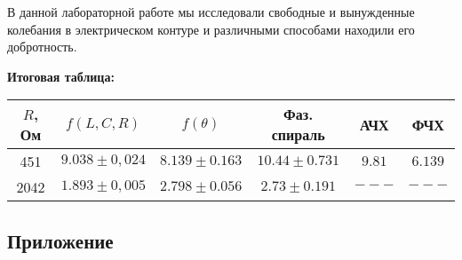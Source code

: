 \documentclass[a4paper,12pt]{article} %
\begin{document}
В данной лабораторной работе мы исследовали свободные и вынужденные колебания в электрическом контуре и различными способами находили его добротность.

\textbf{Итоговая таблица:}
	\begin{table}[h]
		\centering
		\begin{tabular}{|c|c|c|c|c|c|}
			\hline
			$R$, Ом & $f(L, C, R)$ & $f(\theta)$ & Фаз. спираль & АЧХ & ФЧХ \\ \hline
			451 & $9.038 \pm 0,024$ & $8.139 \pm 0.163$& $10.44 \pm 0.731$ & $9.81$ & $6.139$ \\ \hline
			2042 & $1.893 \pm 0,005$ & $2.798 \pm 0.056$ & $2.73 \pm 0.191$ & $---$ & $---$ \\ \hline
		\end{tabular}
	\end{table}

\newpage

\subsection{Приложение}

\begin{figure}[h]
    \begin{minipage}[h]{0.5\linewidth}
    \end{minipage}
    \begin{minipage}[h]{0.5\linewidth}
    \end{minipage}
    \begin{minipage}[h]{0.5\linewidth}
    \end{minipage}
    \begin{minipage}[h]{0.5\linewidth}
    \end{minipage}
    \begin{minipage}[h]{0.5\linewidth}
    \end{minipage}
    \begin{minipage}[h]{0.5\linewidth}
    \end{minipage}
    \begin{minipage}[h]{0.5\linewidth}
    \end{minipage}
    \begin{minipage}[h]{0.5\linewidth}
    \end{minipage}
\end{figure}
\end{document}
